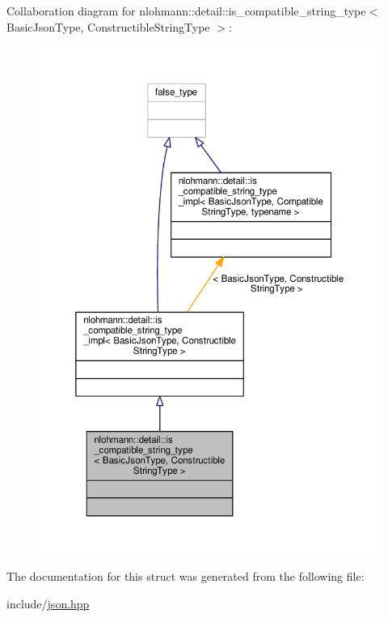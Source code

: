 Collaboration diagram for nlohmann\+:\+:detail\+:\+:is\+\_\+compatible\+\_\+string\+\_\+type$<$ Basic\+Json\+Type, Constructible\+String\+Type $>$\+:
\nopagebreak
\begin{figure}[H]
\begin{center}
\leavevmode
\includegraphics[width=350pt]{structnlohmann_1_1detail_1_1is__compatible__string__type__coll__graph}
\end{center}
\end{figure}


The documentation for this struct was generated from the following file\+:\begin{DoxyCompactItemize}
\item 
include/\hyperlink{json_8hpp}{json.\+hpp}\end{DoxyCompactItemize}
